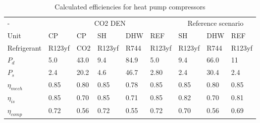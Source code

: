 \begin{table}[h!]
	\centering
	\caption{Calculated efficiencies for heat pump compressors}\vspace{2mm}
	\label{tab:eta_comp} 
\begin{tabular}{l@{\hskip 0.5in}lllll@{\hskip 0.5in}lll} \toprule
	-             & \multicolumn{5}{c}{CO2 DEN}            & \multicolumn{3}{c}{Reference scenario} \\
	Unit          & CP     & CP   & SH     & DHW  & REF    & SH           & DHW       & REF         \\
	Refrigerant   & R123yf & CO2  & R123yf & R744 & R123yf & R123yf       & R744      & R123yf      \\ \midrule
	$P_{d}$       & 5.0    & 43.0 & 9.4    & 84.9 & 5.0    & 9.4          & 66.0      & 11          \\
	$P_{s}$       & 2.4    & 20.2 & 4.6    & 46.7 & 2.80   & 2.4          & 30.4      & 2.4         \\
	$\eta_{mech}$ & 0.85   & 0.80 & 0.85   & 0.78 & 0.85   & 0.85         & 0.80      & 0.85        \\
	$\eta_{is}$   & 0.85   & 0.70 & 0.85   & 0.71 & 0.85   & 0.82         & 0.70      & 0.81        \\
	$\eta_{comp}$ & 0.72   & 0.56 & 0.72   & 0.55 & 0.72   & 0.70         & 0.56      & 0.69       \\ \bottomrule
\end{tabular}
\end{table}